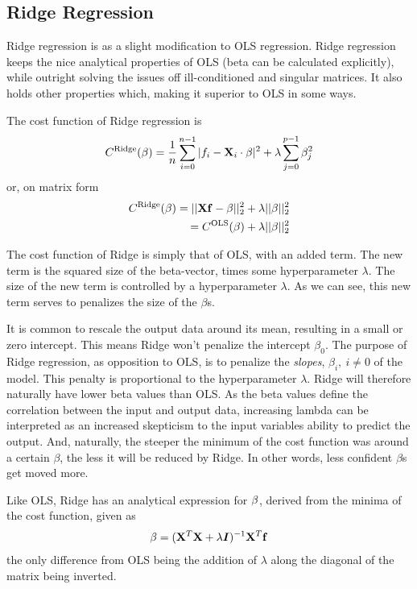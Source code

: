 \documentclass[10pt, twocolumn]{article}
\renewcommand{\b}{\boldsymbol}
\begin{document}
\subsection{Ridge Regression}
\label{subsec:Ridge}
Ridge regression is as a slight modification to OLS regression. Ridge regression keeps the nice analytical properties of OLS (beta can be calculated explicitly), while outright solving the issues off ill-conditioned and singular matrices. It also holds other properties which, making it superior to OLS in some ways.

The cost function of Ridge regression is
\begin{align}
    C^\text{Ridge}(\vb{\beta}) = \frac{1}{n}\sum\limits_{i=0}^{n-1}|f_i - \vb{X}_{i}\cdot \vb{\beta}|^2 + \lambda \sum\limits_{j=0}^{p-1}\beta_j^2
\end{align}
or, on matrix form
\begin{align}
    C^\text{Ridge}(\vb{\beta}) = ||\vb{X} \vb{f} - \vb{\beta} ||^2_2 + \lambda||\vb{\beta}||_2^2 \\
    = C^\text{OLS}(\vb{\beta}) + \lambda||\vb{\beta}||_2^2
\end{align}

The cost function of Ridge is simply that of OLS, with an added term. The new term is the squared size of the beta-vector, times some hyperparameter $\lambda$.  The size of the new term is controlled by a hyperparameter $\lambda$. As we can see, this new term serves to penalizes the size of the $\beta$s.

It is common to rescale the output data around its mean, resulting in a small or zero intercept. This means Ridge won't penalize the intercept $\beta_0$. The purpose of Ridge regression, as opposition to OLS, is to penalize the \textit{slopes}, $\beta_i,\ i\neq 0$ of the model. This penalty is proportional to the hyperparameter $\lambda$. Ridge will therefore naturally have lower beta values than OLS. As the beta values define the correlation between the input and output data, increasing lambda can be interpreted as an increased skepticism to the input variables ability to predict the output. And, naturally, the steeper the minimum of the cost function was around a certain $\beta$, the less it will be reduced by Ridge. In other words, less confident $\beta$s get moved more.


Like OLS, Ridge has an analytical expression for $\vb{\beta}$, derived from the minima of the cost function, given as
\begin{align}\label{eq:ridge_anal}
    \vb{\beta} = (\vb{X}^T \vb{X} + \lambda\b I)^{-1}\vb{X}^T \vb{f}
\end{align}
the only difference from OLS being the addition of $\lambda$ along the diagonal of the matrix being inverted.
\end{document}
